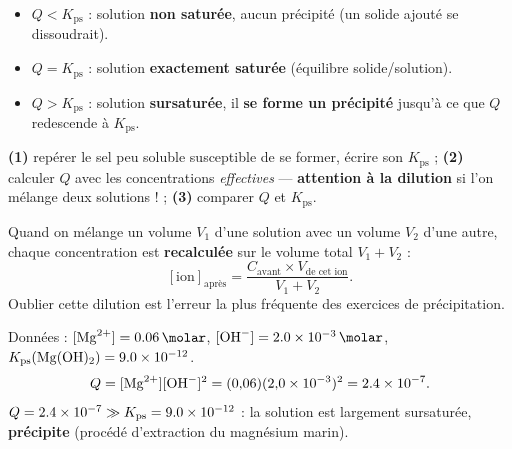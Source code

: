 \documentclass[11pt,a4paper]{article}
\newcommand{\Kps}{K_{\mathrm{ps}}}
\begin{document}
\begin{theoreme}
\begin{itemize}[leftmargin=1.7em,topsep=1pt,itemsep=1pt]
  \item $Q<\Kps$ : solution \textbf{non saturée}, aucun précipité (un solide ajouté se dissoudrait).
  \item $Q=\Kps$ : solution \textbf{exactement saturée} (équilibre solide/solution).
  \item $Q>\Kps$ : solution \textbf{sursaturée}, il \textbf{se forme un précipité} jusqu'à ce que $Q$
        redescende à $\Kps$.
\end{itemize}
\end{theoreme}

\begin{methode}
\textbf{(1)} repérer le sel peu soluble susceptible de se former, écrire son $\Kps$ ;
\textbf{(2)} calculer $Q$ avec les concentrations \emph{effectives} — \textbf{attention à la dilution}
si l'on mélange deux solutions ! ; \textbf{(3)} comparer $Q$ et $\Kps$.
\end{methode}

\begin{attention}
Quand on mélange un volume $V_1$ d'une solution avec un volume $V_2$ d'une autre, chaque concentration
est \textbf{recalculée} sur le volume total $V_1+V_2$ :
\[ [\text{ion}]_{\text{après}} = \dfrac{C_{\text{avant}}\times V_{\text{de cet ion}}}{V_1+V_2}. \]
Oublier cette dilution est l'erreur la plus fréquente des exercices de précipitation.
\end{attention}

\begin{exemple}
Données : $[\ce{Mg^2+}]=\qty{0{,}06}{\molar}$, $[\ce{OH-}]=\qty{2{,}0e-3}{\molar}$,
$\Kps(\ce{Mg(OH)2})=\num{9{,}0e-12}$.
\[ Q=[\ce{Mg^2+}][\ce{OH-}]^{2}=(0{,}06)(2{,}0\times10^{-3})^{2}=\num{2{,}4e-7}. \]
$Q=\num{2{,}4e-7}\gg\Kps=\num{9{,}0e-12}$ : la solution est largement sursaturée, 
\textbf{précipite} (procédé d'extraction du magnésium marin).
\end{exemple}
\end{document}
